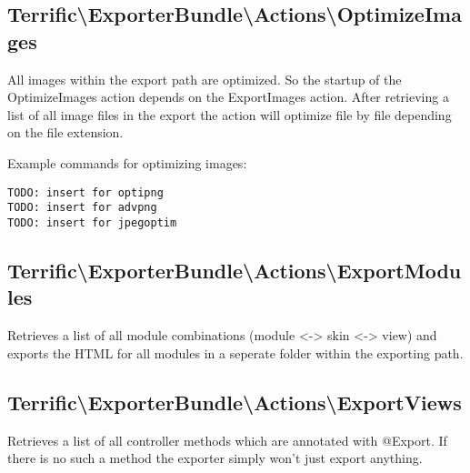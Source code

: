 \subsection{Terrific\textnormal{\textbackslash}ExporterBundle\textnormal{\textbackslash}Actions\textnormal{\textbackslash}OptimizeImages}
All images within the export path are optimized. So the startup of the OptimizeImages action depends on the ExportImages action. After retrieving a list of all image files in the export the action will optimize file by file depending on the file extension.

Example commands for optimizing images:
\begin{verbatim}
TODO: insert for optipng
TODO: insert for advpng
TODO: insert for jpegoptim
\end{verbatim}

\subsection{Terrific\textnormal{\textbackslash}ExporterBundle\textnormal{\textbackslash}Actions\textnormal{\textbackslash}ExportModules}
Retrieves a list of all module combinations (module <-> skin <-> view) and exports the HTML for all modules in a seperate folder within the exporting path.

\subsection{Terrific\textnormal{\textbackslash}ExporterBundle\textnormal{\textbackslash}Actions\textnormal{\textbackslash}ExportViews}
Retrieves a list of all controller methods which are annotated with @Export. If there is no such a method the exporter simply won't just export anything.
